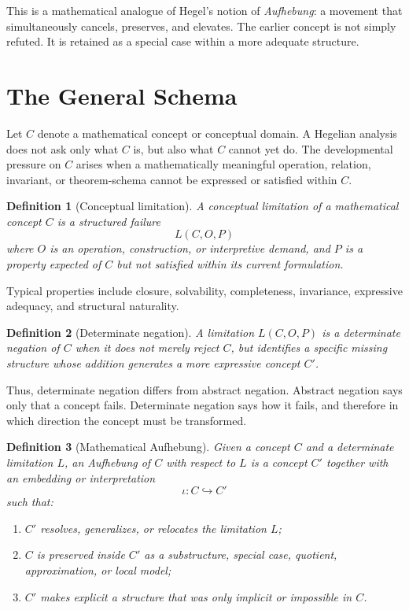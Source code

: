 \documentclass[11pt]{article}
\newtheorem{definition}{Definition}
\begin{document}
This is a mathematical analogue of Hegel's notion of \emph{Aufhebung}: a movement that simultaneously cancels, preserves, and elevates. The earlier concept is not simply refuted. It is retained as a special case within a more adequate structure.

\section{The General Schema}

Let $C$ denote a mathematical concept or conceptual domain. A Hegelian analysis does not ask only what $C$ is, but also what $C$ cannot yet do. The developmental pressure on $C$ arises when a mathematically meaningful operation, relation, invariant, or theorem-schema cannot be expressed or satisfied within $C$.

\begin{definition}[Conceptual limitation]
A \emph{conceptual limitation} of a mathematical concept $C$ is a structured failure
\[
L(C,O,P)
\]
where $O$ is an operation, construction, or interpretive demand, and $P$ is a property expected of $C$ but not satisfied within its current formulation.
\end{definition}

Typical properties include closure, solvability, completeness, invariance, expressive adequacy, and structural naturality.

\begin{definition}[Determinate negation]
A limitation $L(C,O,P)$ is a \emph{determinate negation} of $C$ when it does not merely reject $C$, but identifies a specific missing structure whose addition generates a more expressive concept $C'$.
\end{definition}

Thus, determinate negation differs from abstract negation. Abstract negation says only that a concept fails. Determinate negation says how it fails, and therefore in which direction the concept must be transformed.

\begin{definition}[Mathematical Aufhebung]
Given a concept $C$ and a determinate limitation $L$, an \emph{Aufhebung} of $C$ with respect to $L$ is a concept $C'$ together with an embedding or interpretation
\[
\iota : C \hookrightarrow C'
\]
such that:
\begin{enumerate}[label=(\roman*)]
    \item $C'$ resolves, generalizes, or relocates the limitation $L$;
    \item $C$ is preserved inside $C'$ as a substructure, special case, quotient, approximation, or local model;
    \item $C'$ makes explicit a structure that was only implicit or impossible in $C$.
\end{enumerate}
\end{definition}
\end{document}
